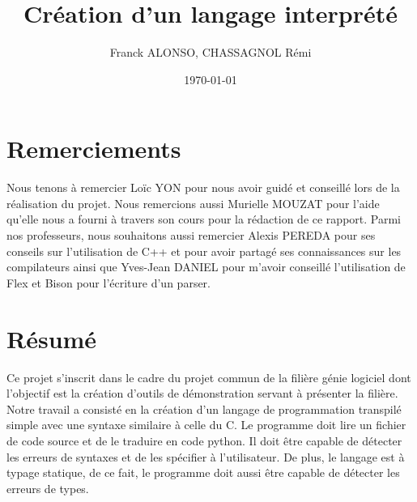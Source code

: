 \documentclass[a4paper]{article}%
\title{Création d'un langage interprété}
\author{Franck ALONSO, CHASSAGNOL Rémi}
\date{\today}
\begin{document}

\clearpage{}

\thispagestyle{empty}
\tableofcontents
\clearpage{}

\section*{Remerciements}

\doublespacing
\large %

Nous tenons à remercier Loïc YON pour nous avoir guidé et conseillé lors de la
réalisation du projet. Nous remercions aussi Murielle MOUZAT pour l'aide qu'elle
nous a fourni à travers son cours pour la rédaction de ce rapport. Parmi nos
professeurs, nous souhaitons aussi remercier Alexis PEREDA pour ses conseils sur
l'utilisation de C++ et pour avoir partagé ses connaissances sur les
compilateurs ainsi que Yves-Jean DANIEL pour m'avoir conseillé l'utilisation de
Flex et Bison pour l'écriture d'un \gls{parser}.

\normalsize
\onehalfspacing

\clearpage{}

\listoffigures
\clearpage{}


\section*{Résumé}

Ce projet s'inscrit dans le cadre du projet commun de la filière génie logiciel
dont l'objectif est la création d'outils de démonstration servant à présenter la
filière. Notre travail a consisté en la création d'un langage de programmation
transpilé simple avec une syntaxe similaire à celle du C. Le programme doit lire
un fichier de code source et de le traduire en code python. Il doit être capable
de détecter les erreurs de syntaxes et de les spécifier à l'utilisateur. De
plus, le langage est à typage statique, de ce fait, le programme doit aussi être
capable de détecter les erreurs de types.\\
\end{document}
